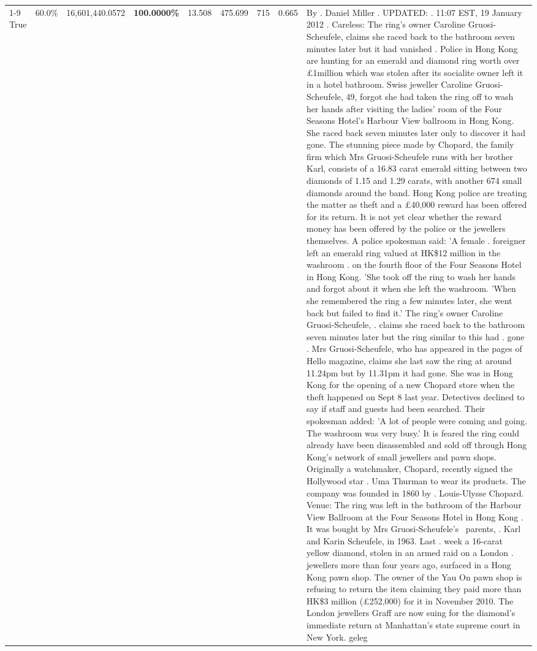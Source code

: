 \begin{table}[H]
\begin{tabular}{lllrlllll}
\cline{1-9}
True & 60.0\% & 16,601,440.0572 & \bfseries \color{red} 100.0000\% & 13.508 & 475.699 & 715 & 0.665 & By . Daniel Miller . UPDATED: . 11:07 EST, 19 January 2012 . Careless: The ring's owner Caroline Gruosi-Scheufele, claims she raced back to the bathroom seven minutes later but it had vanished . Police in Hong Kong are hunting for an emerald and diamond ring worth over £1million which was stolen after its socialite owner left it in a hotel bathroom. Swiss jeweller Caroline Gruosi-Scheufele, 49, forgot she had taken the ring off to wash her hands after visiting the ladies' room of the Four Seasons Hotel's Harbour View ballroom in Hong Kong. She raced back seven minutes later only to discover it had gone. The stunning piece made by Chopard, the family firm which Mrs Gruosi-Scheufele runs with her brother Karl, consists of a 16.83 carat emerald sitting between two diamonds of 1.15 and 1.29 carats, with another 674 small diamonds around the band. Hong Kong police are treating the matter as theft and a £40,000 reward has been offered for its return. It is not yet clear whether the reward money has been offered by the police or the jewellers themselves. A police spokesman said: 'A female . foreigner left an emerald ring valued at HK\$12 million in the washroom . on the fourth floor of the Four Seasons Hotel in Hong Kong. 'She took off the ring to wash her hands and forgot about it when she left the washroom. 'When she remembered the ring a few minutes later, she went back but failed to find it.' The ring's owner Caroline Gruosi-Scheufele, . claims she raced back to the bathroom seven minutes later but the ring similar to this had . gone . Mrs Gruosi-Scheufele, who has appeared in the pages of Hello magazine, claims she last saw the ring at around 11.24pm but by 11.31pm it had gone. She was in Hong Kong for the opening of a new Chopard store when the theft happened on Sept 8 last year. Detectives declined to say if staff and guests had been searched. Their spokesman added: 'A lot of people were coming and going. The washroom was very busy.' It is feared the ring could already have been disassembled and sold off through Hong Kong's network of small jewellers and pawn shops. Originally a watchmaker, Chopard, recently signed the Hollywood star . Uma Thurman to wear its products. The company was founded in 1860 by . Louis-Ulysse Chopard. Venue: The ring was left in the bathroom of the Harbour View Ballroom at the Four Seasons Hotel in Hong Kong . It was bought by Mrs Gruosi-Scheufele's  parents, . Karl and Karin Scheufele, in 1963. Last . week a 16-carat yellow diamond, stolen in an armed raid on a London . jewellers more than four years ago, surfaced in a Hong Kong pawn shop. The owner of the Yau On pawn shop is refusing to return the item claiming they paid more than HK\$3 million (£252,000) for it in November 2010. The London jewellers Graff are now suing for the diamond’s immediate return at Manhattan’s state supreme court in New York. geleg \\

\end{tabular}
\end{table}
